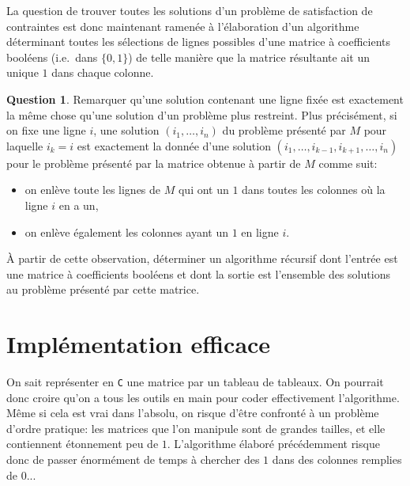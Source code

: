 \documentclass[french,a4paper]{article}
\theoremstyle{definition}
\newtheorem{question}{Question}
\theoremstyle{remark}
\begin{document}
La question de trouver toutes les solutions d'un problème de
satisfaction de contraintes est donc maintenant ramenée à
l'élaboration d'un algorithme déterminant toutes les sélections de
lignes possibles d'une matrice à coefficients booléens (i.e.\ dans
$\{0,1\}$) de telle manière que la matrice résultante ait un unique
$1$ dans chaque colonne.

\begin{question}
  \label{question:recursive-matrix}%
  Remarquer qu'une solution contenant une ligne fixée est exactement
  la même chose qu'une solution d'un problème plus restreint. Plus
  précisément, si on fixe une ligne $i$, une solution
  $(i_1,\dots,i_n)$ du problème présenté par $M$ pour laquelle $i_k=i$
  est exactement la donnée d'une solution
  $(i_1,\dots,i_{k-1},i_{k+1},\dots,i_n)$ pour le problème présenté
  par la matrice obtenue à partir de $M$ comme suit:
  \begin{itemize}
  \item on enlève toute les lignes de $M$ qui ont un $1$ dans toutes
    les colonnes où la ligne $i$ en a un,
  \item on enlève également les colonnes ayant un $1$ en ligne $i$.
  \end{itemize}

  \`A partir de cette observation, déterminer un algorithme récursif
  dont l'entrée est une matrice à coefficients booléens et dont la
  sortie est l'ensemble des solutions au problème présenté par cette
  matrice.
\end{question}

\section{Implémentation efficace}
\label{sec:dlx}

On sait représenter en {\tt C} une matrice par un tableau de
tableaux. On pourrait donc croire qu'on a tous les outils en main pour
coder effectivement l'algorithme. Même si cela est vrai dans l'absolu,
on risque d'être confronté à un problème d'ordre pratique: les
matrices que l'on manipule sont de grandes tailles, et elle
contiennent étonnement peu de $1$. L'algorithme élaboré précédemment
risque donc de passer énormément de temps à chercher des $1$ dans des
colonnes remplies de $0$...
\end{document}
